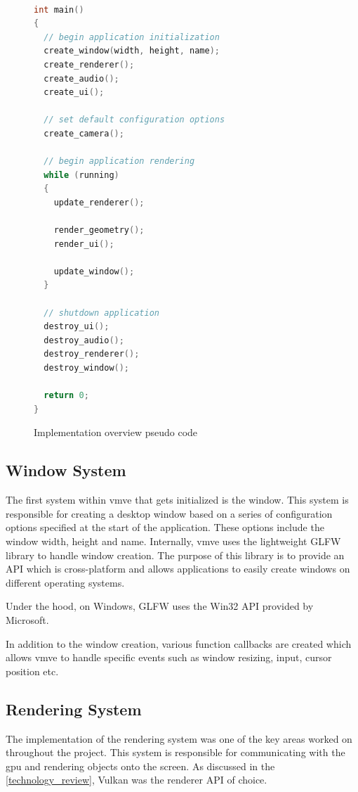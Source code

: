 \documentclass[11pt]{article}
\begin{document}
\begin{figure}[ht]
\centering
\begin{lstlisting}[language=C++]

int main()
{
  // begin application initialization
  create_window(width, height, name);
  create_renderer();
  create_audio();
  create_ui();

  // set default configuration options
  create_camera();
  
  // begin application rendering
  while (running)
  {
    update_renderer();

    render_geometry();
    render_ui();

    update_window();
  }

  // shutdown application
  destroy_ui();
  destroy_audio();
  destroy_renderer();
  destroy_window();

  return 0;
}
\end{lstlisting}
\caption{Implementation overview pseudo code}
\label{fig:overview_pseudo_code}
\end{figure}

  

\subsection{Window System}
The first system within \gls{vmve} that gets initialized is the window. This system is
responsible for creating a desktop window based on a series of configuration
options specified at the start of the application. These options include the
window width, height and name. Internally, \gls{vmve} uses the lightweight GLFW
library to handle window creation. The purpose of this library is to provide an
API which is cross-platform and allows applications to easily create windows on
different operating systems. 

Under the hood, on Windows, GLFW uses the Win32 API provided by Microsoft.

In addition to the window creation, various function callbacks are created
which allows \gls{vmve} to handle specific events such as window resizing, input,
cursor position etc.

\subsection{Rendering System}
The implementation of the rendering system was one of the key areas worked on
throughout the project. This system is responsible for communicating with the
\gls{gpu} and rendering objects onto the screen. As discussed in the
\ref{technology_review}, Vulkan was the renderer API of choice. 
\end{document}
